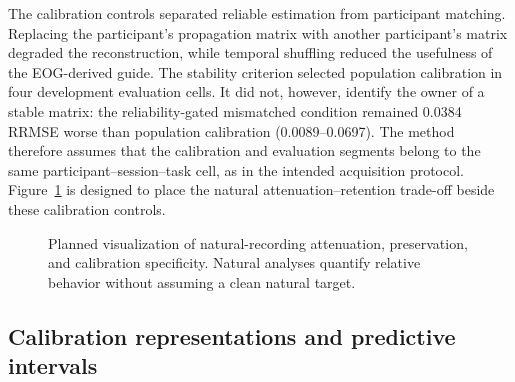 The calibration controls separated reliable estimation from participant matching. Replacing the participant's propagation matrix with another participant's matrix degraded the reconstruction, while temporal shuffling reduced the usefulness of the EOG-derived guide. The stability criterion selected population calibration in four development evaluation cells. It did not, however, identify the owner of a stable matrix: the reliability-gated mismatched condition remained 0.0384 RRMSE worse than population calibration (0.0089--0.0697). The method therefore assumes that the calibration and evaluation segments belong to the same participant--session--task cell, as in the intended acquisition protocol. Figure~\ref{fig:natural-results} is designed to place the natural attenuation--retention trade-off beside these calibration controls.

\begin{figure}[t]
  \centering
  \caption{Planned visualization of natural-recording attenuation, preservation, and calibration specificity. Natural analyses quantify relative behavior without assuming a clean natural target.}
  \label{fig:natural-results}
\end{figure}

\subsection{Calibration representations and predictive intervals}

